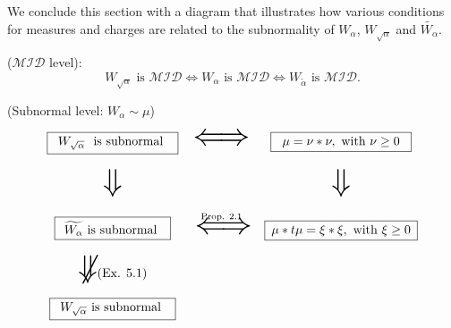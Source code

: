 \documentclass[12pt]{amsart}
\begin{document}
\bigskip
We conclude this section with a diagram that illustrates how various conditions for measures and charges are related to the subnormality of $W_\alpha$, $W_{\sqrt{\alpha}}$ and $\widetilde{W_\alpha}$.

($\mathcal{MID}$ level):  
$$
W_{\sqrt{\alpha}} \textrm{ is } \mathcal{MID}
\Longleftrightarrow
W_{\alpha} \textrm{ is } \mathcal{MID}
\Longleftrightarrow
W_{\widetilde{\alpha}} \textrm{ is } \mathcal{MID}.
$$

\bigskip
(Subnormal level: $W_\alpha \sim \mu$)

\[\begin{array}{ccc} 
\framebox[1.2\width][c]{$W_{\sqrt{\alpha}}$ \textrm{ is subnormal }} \par & \mbox{\Huge{$\Longleftrightarrow$}}
 & \framebox[1.2\width][c]{$\mu = \nu * \nu, \textrm{ with } \nu \ge 0$} \par 
  \\ & & \\ \mbox{\Huge{$\Downarrow$}} & & \mbox{\Huge{$\Downarrow$}} 
  \\ & & \\ 
  \framebox[1.2\width][c]{$\widetilde{W_\alpha} \textrm{ is subnormal }$} \par & \overset{\textrm{Prop. 2.1} \vspace{4pt}}{\mbox{ \Huge{$\Longleftrightarrow$}}}
 & \framebox[1.1\width][c]{$\mu * t \mu = \xi * \xi, \textrm{ with } \xi \ge 0$} \par \\ & & \\ 
 \mbox{\Huge{$\not\Downarrow$}} (\textrm{Ex. 5.1})  & & \\
 & & \\
 \framebox[1.2\width][c]{$W_{\sqrt{\alpha}} \textrm{ is subnormal }$} \par & &
 \end{array}\]

\bigskip
\end{document}
